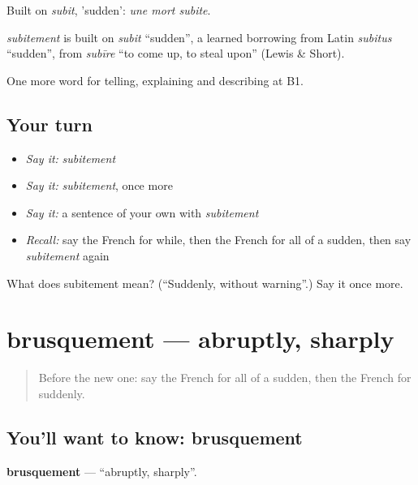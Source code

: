 Built on \emph{subit}, 'sudden': \emph{une mort subite}.

\begin{cousinweb}
\emph{subitement} is built on \emph{subit} \textquotedblleft{}sudden\textquotedblright{}, a learned borrowing from Latin \emph{subitus} \textquotedblleft{}sudden\textquotedblright{}, from \emph{subīre} \textquotedblleft{}to come up, to steal upon\textquotedblright{} (Lewis \& Short).
\end{cousinweb}

\begin{grammarlens}[title={What you've built}]
One more word for telling, explaining and describing at B1.
\end{grammarlens}

\subsection*{Your turn}
\begin{itemize}
\raggedright
  \item \emph{Say it:} \emph{subitement}
  \item \emph{Say it:} \emph{subitement}, once more
  \item \emph{Say it:} a sentence of your own with \emph{subitement}
  \item \emph{Recall:} say the French for while, then the French for all of a sudden, then say \emph{subitement} again
\end{itemize}

\begin{tcolorbox}[breakable,colback=teal!4,colframe=teal!35!black,title={Before you move on}]
What does subitement mean? (\textquotedblleft{}Suddenly, without warning\textquotedblright{}.) Say it once more.
\end{tcolorbox}
\section[brusquement]{brusquement — abruptly, sharply}

\label{lesson:FR-C270-brusquement}



\begin{quote}
Before the new one: say the French for all of a sudden, then the French for suddenly.
\end{quote}

\subsection*{You'll want to know: brusquement}
\textbf{brusquement} — \textquotedblleft{}abruptly, sharply\textquotedblright{}.

